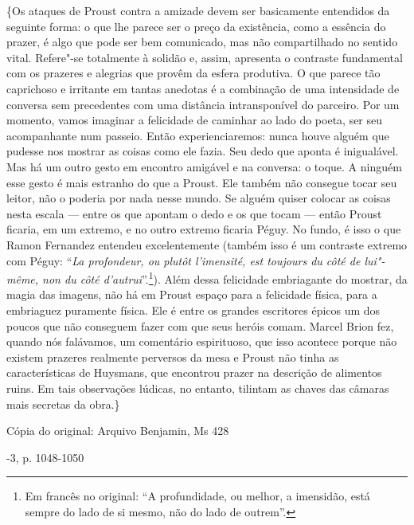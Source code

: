 \{Os ataques de Proust contra a amizade devem ser basicamente entendidos
da seguinte forma: o que lhe parece ser o preço da existência, como a
essência do prazer, é algo que pode ser bem comunicado, mas não
compartilhado no sentido vital. Refere"-se totalmente à solidão e, assim,
apresenta o contraste fundamental com os prazeres e alegrias que provêm
da esfera produtiva. O que parece tão caprichoso e irritante em tantas
anedotas é a combinação de uma intensidade de conversa sem precedentes
com uma distância intransponível do parceiro. Por um momento, vamos
imaginar a felicidade de caminhar ao lado do poeta, ser seu acompanhante
num passeio. Então experienciaremos: nunca houve alguém que pudesse nos
mostrar as coisas como ele fazia. Seu dedo que aponta é inigualável. Mas
há um outro gesto em encontro amigável e na conversa: o toque. A ninguém
esse gesto é mais estranho do que a Proust. Ele também não consegue
tocar seu leitor, não o poderia por nada nesse mundo. Se alguém quiser
colocar as coisas nesta escala --- entre os que apontam o dedo e os que
tocam --- então Proust ficaria, em um extremo, e no outro extremo ficaria
Péguy. No fundo, é isso o que Ramon Fernandez entendeu excelentemente
(também isso é um contraste extremo com Péguy: ``\emph{La profondeur, ou
plutôt l'imensité, est toujours du côté de lui"-même, non du côté
d'autrui}''.\footnote{Em francês no original: ``A profundidade, ou melhor, a imensidão,
  está sempre do lado de si mesmo, não do lado de outrem''. \versal{[N. T.]}}). Além
dessa felicidade embriagante do mostrar, da magia das imagens, não há em
Proust espaço para a felicidade física, para a embriaguez puramente
física. Ele é entre os grandes escritores épicos um dos poucos que não
conseguem fazer com que seus heróis comam. Marcel Brion fez, quando nós
falávamos, um comentário espirituoso, que isso acontece porque não
existem prazeres realmente perversos da mesa e Proust não tinha as
características de Huysmans, que encontrou prazer na descrição de
alimentos ruins. Em tais observações lúdicas, no entanto, tilintam as
chaves das câmaras mais secretas da obra.\}

Cópia do original: Arquivo Benjamin, Ms 428

-3, p. 1048-1050


